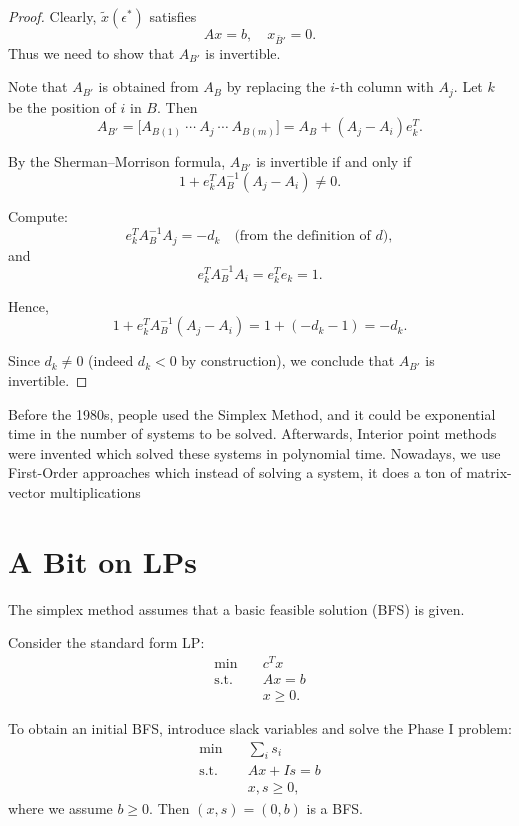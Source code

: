 \documentclass[12pt,oneside]{book}
\numberwithin{equation}{section}
\theoremstyle{definition}
\theoremstyle{plain}
\theoremstyle{remark}
\begin{document}
\begin{proof}
Clearly, $\tilde{x}(\epsilon^*)$ satisfies
\[
Ax = b, \quad x_{\bar{B}'} = 0.
\]
Thus we need to show that $A_{B'}$ is invertible.

Note that $A_{B'}$ is obtained from $A_B$ by replacing the $i$-th column with $A_j$. Let $k$ be the position of $i$ in $B$. Then
\[
A_{B'} = \big[ A_{B(1)} \ \cdots \ A_j \ \cdots \ A_{B(m)} \big]
= A_B + (A_j - A_i) e_k^T.
\]

By the Sherman--Morrison formula, $A_{B'}$ is invertible if and only if
\[
1 + e_k^T A_B^{-1} (A_j - A_i) \neq 0.
\]

Compute:
\[
e_k^T A_B^{-1} A_j = -d_k
\quad \text{(from the definition of $d$)},
\]
and
\[
e_k^T A_B^{-1} A_i = e_k^T e_k = 1.
\]

Hence,
\[
1 + e_k^T A_B^{-1} (A_j - A_i)
= 1 + (-d_k - 1)
= -d_k.
\]

Since $d_k \neq 0$ (indeed $d_k < 0$ by construction), we conclude that $A_{B'}$ is invertible.
\end{proof}

Before the 1980s, people used the Simplex Method, and it could be exponential time in the number of systems to be solved. Afterwards, Interior point methods were invented which solved these systems in polynomial time. Nowadays, we use First-Order approaches which instead of solving a system, it does a ton of matrix-vector multiplications

\section{A Bit on LPs}

The simplex method assumes that a basic feasible solution (BFS) is given.

Consider the standard form LP:
\[
\begin{aligned}
\min \quad & c^T x \\
\text{s.t.} \quad & Ax = b \\
& x \ge 0.
\end{aligned}
\]

To obtain an initial BFS, introduce slack variables and solve the Phase I problem:
\[
\begin{aligned}
\min \quad & \sum_i s_i \\
\text{s.t.} \quad & Ax + Is = b \\
& x, s \ge 0,
\end{aligned}
\]
where we assume $b \ge 0$. Then $(x,s) = (0,b)$ is a BFS.
\end{document}
